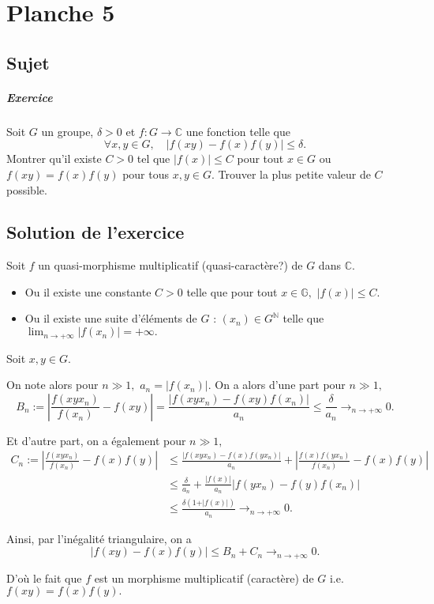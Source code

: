 \chapter{Planche 5}

\section{Sujet}

\paragraph{Exercice}
Soit $G$ un groupe, $\delta > 0$ et $f : G \to \mathbb C$ une fonction telle que
\[
\forall x,y \in G,\quad |f(xy)-f(x)f(y)| \leqslant \delta.
\]
Montrer qu'il existe $C > 0$ tel que $|f(x)| \leqslant C$ pour tout $x \in G$ ou $f(xy) = f(x)f(y)$ pour tous $x,y \in G$.
Trouver la plus petite valeur de $C$ possible.

\section{Solution de l'exercice}

Soit $f$ un quasi-morphisme multiplicatif (quasi-caractère?) de $G$ dans $\mathbb{C}.$\\

\begin{itemize}
\item Ou il existe une constante $C>0$ telle que pour tout $x\in \mathbb{G},$ $\displaystyle \vert f(x) \vert \leq C.$
\item Ou il existe une suite d'éléments de $G$ : $\displaystyle (x_{n})\in G^{\mathbb{N}}$ telle que $\displaystyle \lim_{n\rightarrow +\infty} \vert f(x_{n})\vert =+\infty.$
\end{itemize}

Soit $x,y\in G.$ 

On note alors pour $n\gg 1,$ $a_{n}=\vert f(x_{n})\vert.$
On a alors d'une part pour $n\gg1,$ $$B_{n}:=\left \vert \frac{f(xyx_{n})}{f(x_{n})}-f(xy) \right\vert =\frac{ \vert f(xyx_{n})-f(xy)f(x_{n}) \vert }{a_{n}}\leq \frac{\delta}{a_{n}}\longrightarrow_{n\rightarrow +\infty} 0.$$

Et d'autre part, on a également pour $n\gg 1,$ 
\begin{align*}
C_{n}:=\left\vert \frac{f(xyx_{n})}{f(x_{n})}-f(x)f(y) \right\vert & \leq \frac{ \vert f(xyx_{n})-f(x)f(yx_{n})\vert }{a_{n}}+ \left\vert \frac{f(x)f(yx_{n})}{f(x_{n})}-f(x)f(y) \right\vert\\
& \leq \frac{\delta}{a_{n}}+ \frac{\vert f(x) \vert }{a_{n}}\vert f(yx_{n})-f(y)f(x_{n})\vert\\
& \leq \frac{\delta(1+\vert f(x) \vert )}{a_{n}}\longrightarrow_{n\rightarrow +\infty} 0.
\end{align*}

Ainsi, par l'inégalité triangulaire, on a $$\vert f(xy)-f(x)f(y)\vert \leq B_{n}+C_{n}\longrightarrow_{n\rightarrow +\infty}0.$$

D'où le fait que $f$ est un morphisme multiplicatif (caractère) de $G$ i.e. $\displaystyle f(xy)=f(x)f(y).$
